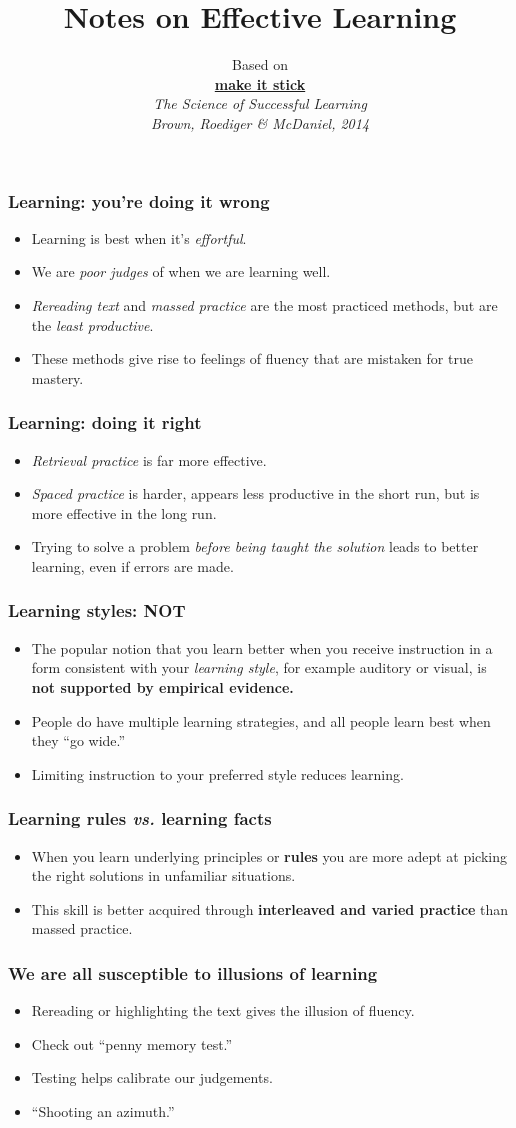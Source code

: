 \documentclass{beamer}
\title{Notes on Effective Learning}
\author{Based on\\
\href{http://makeitstick.net/}{\bf make it stick}\\
\em The Science of Successful Learning
\\\small Brown, Roediger \& McDaniel, 2014}
\newcommand{\bi}{\begin{itemize}}
\newcommand{\li}{\item}
\newcommand{\ei}{\end{itemize}}
\newcommand{\bfr}[1]{\begin{frame}[fragile]\frametitle{{ #1 }}}
\begin{document}
\begin{frame}
\maketitle

\end{frame}


\bfr{Learning: you're doing it wrong}
\bi
\li Learning is best when it's {\em effortful}.\pause
\li We are {\em poor judges} of when we are learning well.\pause
\li {\em Rereading text} and {\em massed practice} are the most
practiced methods, but are the {\em least productive}.\pause
\li These methods give rise to feelings of fluency that are mistaken
for true mastery. 
\ei
\end{frame}

\bfr{Learning: doing it right}
\bi
\li {\em Retrieval practice} is far more effective.\pause
\li {\em Spaced practice} is harder, appears less productive in the short run,
but is more effective in the long run.\pause
\li Trying to solve a problem {\em before being taught the solution}
leads to better learning, even if errors are made.
\ei
\end{frame}

\bfr{Learning styles:  NOT}
\bi
\li The popular notion that you learn better when you receive
instruction in a form consistent with your {\em learning style}, for
example auditory or visual, is {\bf not supported by empirical
  evidence.} \pause
\li People do have multiple learning strategies, and all people learn
best when they ``go wide.''\pause
\li Limiting instruction to your preferred style reduces learning.
\ei
\end{frame}

\bfr{Learning rules {\em vs.} learning facts}
\bi
\li When you learn underlying principles or {\bf rules} you are more
adept at picking the right solutions in unfamiliar situations.\pause
\li This skill is better acquired through {\bf interleaved and varied
  practice} than massed practice.
\ei
\end{frame}

\bfr{We are all susceptible to {\bf illusions} of learning}
\bi
\li Rereading or highlighting 
the text gives the illusion of fluency.\pause
\li Check out ``penny memory test.''\pause
\li Testing helps calibrate our judgements.\pause
\li ``Shooting an azimuth.''
\ei
\end{frame}
\end{document}
